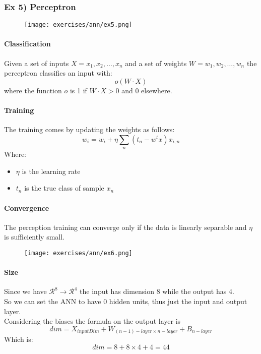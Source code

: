 \subsubsection{Ex 5) Perceptron}

\begin{figure}[H]
    \centering
    \texttt{[image: exercises/ann/ex5.png]}
\end{figure}

\paragraph{Classification}
Given a set of inputs $X=x_1,x_2,\dots, x_n$ and a set of weights $W=w_1,w_2,\dots,w_n$ the perceptron classifies an input with:
$$o(W\cdot X)$$
where the function $o$ is 1 if $W\cdot X >0$ and 0 elsewhere.

\paragraph{Training}
The training comes by updating the weights as follows:
$$w_i=w_i+\eta \sum_n (t_n-w^tx)x_{i,n}$$
Where:
\begin{itemize}
\item $\eta$ is the learning rate
\item $t_n$ is the true class of sample $x_n$
\end{itemize}

\paragraph{Convergence}
The perception training can converge only if the data is linearly separable and $\eta$ is sufficiently small.



\begin{figure}[H]
    \centering
    \texttt{[image: exercises/ann/ex6.png]}
\end{figure}

\paragraph{Size}
Since we have $\mathcal{R}^8 \to \mathcal{R}^4$ the input has dimension 8 while the output has 4.\\
So we can set the ANN to have 0 hidden units, thus just the input and output layer.\\
Considering the biases the formula on the output layer is
$$dim=X_{inputDim}+W_{(n-1)-layer\times n-layer}+B_{n-layer}$$
Which is:
$$dim=8+8\times 4 +4=44$$

